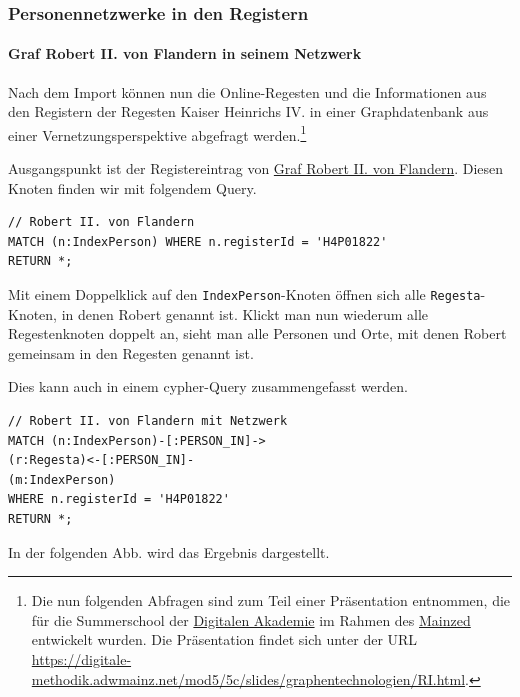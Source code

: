 \hypertarget{personennetzwerke-in-den-registern}{%
\subsubsection{Personennetzwerke in den
Registern}\label{personennetzwerke-in-den-registern}}

\hypertarget{graf-robert-ii.-von-flandern-in-seinem-netzwerk}{%
\paragraph{Graf Robert II. von Flandern in seinem
Netzwerk}\label{graf-robert-ii.-von-flandern-in-seinem-netzwerk}}

Nach dem Import können nun die Online-Regesten und die Informationen aus
den Registern der Regesten Kaiser Heinrichs IV. in einer Graphdatenbank
aus einer Vernetzungsperspektive abgefragt werden.\footnote{Die nun
  folgenden Abfragen sind zum Teil einer Präsentation entnommen, die für
  die Summerschool der \href{https://www.digitale-akademie.de}{Digitalen
  Akademie} im Rahmen des \href{https://www.mainzed.org/de}{Mainzed}
  entwickelt wurden. Die Präsentation findet sich unter der URL
  \url{https://digitale-methodik.adwmainz.net/mod5/5c/slides/graphentechnologien/RI.html}.}

Ausgangspunkt ist der Registereintrag von
\href{https://de.wikipedia.org/wiki/Robert_II._(Flandern)}{Graf Robert
II. von Flandern}. Diesen Knoten finden wir mit folgendem Query.

\begin{verbatim}
// Robert II. von Flandern
MATCH (n:IndexPerson) WHERE n.registerId = 'H4P01822'
RETURN *;
\end{verbatim}

Mit einem Doppelklick auf den \texttt{IndexPerson}-Knoten öffnen sich
alle \texttt{Regesta}-Knoten, in denen Robert genannt ist. Klickt man
nun wiederum alle Regestenknoten doppelt an, sieht man alle Personen und
Orte, mit denen Robert gemeinsam in den Regesten genannt ist.

Dies kann auch in einem cypher-Query zusammengefasst werden.

\begin{verbatim}
// Robert II. von Flandern mit Netzwerk
MATCH (n:IndexPerson)-[:PERSON_IN]->
(r:Regesta)<-[:PERSON_IN]-
(m:IndexPerson)
WHERE n.registerId = 'H4P01822'
RETURN *;
\end{verbatim}

In der folgenden Abb. wird das Ergebnis dargestellt.

